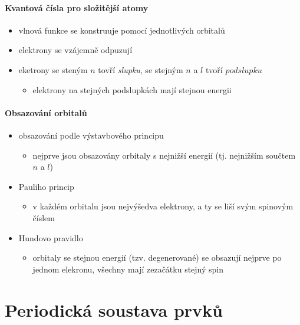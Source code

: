 \documentclass[DIV=8]{scrreprt}
\begin{document}
\paragraph{Kvantová čísla pro složitější atomy}
\begin{itemize}[nosep]
    \item vlnová funkce se konstruuje pomocí jednotlivých orbitalů
    \item elektrony se vzájemně odpuzují
    \item eketrony se steným \(n\) tovří \emph{slupku}, se stejným \(n\) a \(l\) tvoří \(podslupku\)
\begin{itemize}[nosep]
    \item elektrony na stejných podslupkách mají stejnou energii
\end{itemize}

\end{itemize}



\paragraph{Obsazování orbitalů}
\begin{itemize}[nosep]
    \item obsazování podle výstavbového principu
\begin{itemize}[nosep]
    \item nejprve jsou obsazovány orbitaly s nejnižší energií (tj. nejnižším součtem \(n\) a \(l\))
\end{itemize}

    \item Pauliho princip
\begin{itemize}[nosep]
    \item v každém orbitalu jsou nejvýšedva elektrony, a ty se liší svým spinovým číslem
\end{itemize}

    \item Hundovo pravidlo
\begin{itemize}[nosep]
    \item orbitaly se stejnou energií (tzv. degenerované) se obsazují nejprve po jednom elekronu, všechny mají zezačátku stejný spin
\end{itemize}

\end{itemize}



\section{Periodická soustava prvků} \label{Periodická soustava prvků}
\end{document}

